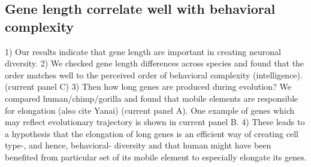 \subsection{Gene length correlate well with behavioral complexity}

1) Our results indicate that gene length are important in creating neuronal diversity.
2) We checked gene length differences across species and found that the order matches well to the perceived order of behavioral complexity (intelligence).  (current panel C)
3) Then how long genes are produced during evolution? We compared human/chimp/gorilla and found that mobile elements are responsible for elongation (also cite Yanai) (current panel A). One example of genes which may reflect evolutionary trajectory is shown in current panel B. 
4) These leads to a hypothesis that the elongation of long genes is an efficient way of creating cell type-, and hence, behavioral- diversity and that human might have been benefited from particular set of its mobile element to especially elongate its genes. 

